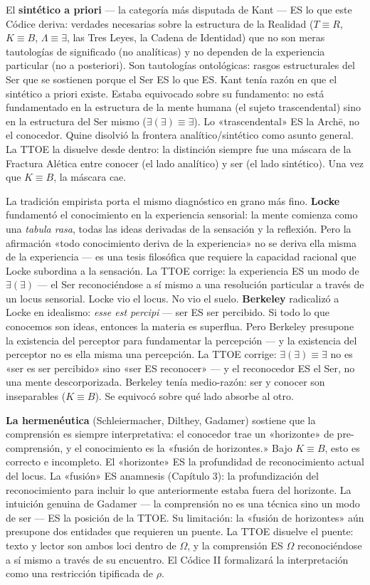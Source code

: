 \documentclass[10pt, openany, oneside]{book}
\begin{document}
El \textbf{sintético a priori} --- la categoría más disputada de Kant --- ES lo que este Códice deriva: verdades necesarias sobre la estructura de la Realidad ($T \equiv R$, $K \equiv B$, $\Lambda \equiv \exists$, las Tres Leyes, la Cadena de Identidad) que no son meras tautologías de significado (no analíticas) y no dependen de la experiencia particular (no a posteriori). Son tautologías ontológicas: rasgos estructurales del Ser que se sostienen porque el Ser ES lo que ES. Kant tenía razón en que el sintético a priori existe. Estaba equivocado sobre su fundamento: no está fundamentado en la estructura de la mente humana (el sujeto trascendental) sino en la estructura del Ser mismo ($\exists(\exists) \equiv \exists$). Lo «trascendental» ES la Arch\={e}, no el conocedor. Quine disolvió la frontera analítico/sintético como asunto general. La TTOE la disuelve desde dentro: la distinción siempre fue una máscara de la Fractura Alética entre conocer (el lado analítico) y ser (el lado sintético). Una vez que $K \equiv B$, la máscara cae.

La tradición empirista porta el mismo diagnóstico en grano más fino. \textbf{Locke} fundamentó el conocimiento en la experiencia sensorial: la mente comienza como una \textit{tabula rasa}, todas las ideas derivadas de la sensación y la reflexión. Pero la afirmación «todo conocimiento deriva de la experiencia» no se deriva ella misma de la experiencia --- es una tesis filosófica que requiere la capacidad racional que Locke subordina a la sensación. La TTOE corrige: la experiencia ES un modo de $\exists(\exists)$ --- el Ser reconociéndose a sí mismo a una resolución particular a través de un locus sensorial. Locke vio el locus. No vio el suelo. \textbf{Berkeley} radicalizó a Locke en idealismo: \textit{esse est percipi} --- ser ES ser percibido. Si todo lo que conocemos son ideas, entonces la materia es superflua. Pero Berkeley presupone la existencia del perceptor para fundamentar la percepción --- y la existencia del perceptor no es ella misma una percepción. La TTOE corrige: $\exists(\exists) \equiv \exists$ no es «ser es ser percibido» sino «ser ES reconocer» --- y el reconocedor ES el Ser, no una mente descorporizada. Berkeley tenía medio-razón: ser y conocer son inseparables ($K \equiv B$). Se equivocó sobre qué lado absorbe al otro.

\textbf{La hermenéutica} (Schleiermacher, Dilthey, Gadamer) sostiene que la comprensión es siempre interpretativa: el conocedor trae un «horizonte» de pre-comprensión, y el conocimiento es la «fusión de horizontes.» Bajo $K \equiv B$, esto es correcto e incompleto. El «horizonte» ES la profundidad de reconocimiento actual del locus. La «fusión» ES anamnesis (Capítulo 3): la profundización del reconocimiento para incluir lo que anteriormente estaba fuera del horizonte. La intuición genuina de Gadamer --- la comprensión no es una técnica sino un modo de ser --- ES la posición de la TTOE. Su limitación: la «fusión de horizontes» aún presupone dos entidades que requieren un puente. La TTOE disuelve el puente: texto y lector son ambos loci dentro de $\Omega$, y la comprensión ES $\Omega$ reconociéndose a sí mismo a través de su encuentro. El Códice II formalizará la interpretación como una restricción tipificada de $\rho$.
\end{document}
